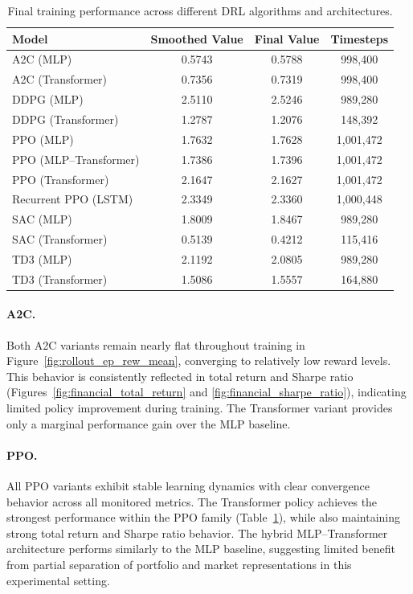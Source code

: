 \begin{table}[h]
\centering
\begin{tabular}{lccc}
\hline
\textbf{Model} & \textbf{Smoothed Value} & \textbf{Final Value} & \textbf{Timesteps} \\
\hline
A2C (MLP) & 0.5743 & 0.5788 & 998,400 \\
A2C (Transformer) & 0.7356 & 0.7319 & 998,400 \\
DDPG (MLP) & 2.5110 & 2.5246 & 989,280 \\
DDPG (Transformer) & 1.2787 & 1.2076 & 148,392 \\
PPO (MLP) & 1.7632 & 1.7628 & 1,001,472 \\
PPO (MLP--Transformer) & 1.7386 & 1.7396 & 1,001,472 \\
PPO (Transformer) & 2.1647 & 2.1627 & 1,001,472 \\
Recurrent PPO (LSTM) & 2.3349 & 2.3360 & 1,000,448 \\
SAC (MLP) & 1.8009 & 1.8467 & 989,280 \\
SAC (Transformer) & 0.5139 & 0.4212 & 115,416 \\
TD3 (MLP) & 2.1192 & 2.0805 & 989,280 \\
TD3 (Transformer) & 1.5086 & 1.5557 & 164,880 \\
\hline
\end{tabular}
\caption{Final training performance across different DRL algorithms and architectures.}
\label{tab:training_results}
\end{table}

\paragraph{A2C.}
Both A2C variants remain nearly flat throughout training in
Figure~\ref{fig:rollout_ep_rew_mean}, converging to relatively low reward levels.
This behavior is consistently reflected in total return and Sharpe ratio
(Figures~\ref{fig:financial_total_return} and
\ref{fig:financial_sharpe_ratio}), indicating limited policy improvement during
training. The Transformer variant provides only a marginal performance gain over the
MLP baseline.

\paragraph{PPO.}
All PPO variants exhibit stable learning dynamics with clear convergence behavior across
all monitored metrics. The Transformer policy achieves the strongest performance within
the PPO family (Table~\ref{tab:training_results}), while also maintaining strong total
return and Sharpe ratio behavior. The hybrid MLP--Transformer architecture performs
similarly to the MLP baseline, suggesting limited benefit from partial separation of
portfolio and market representations in this experimental setting.

